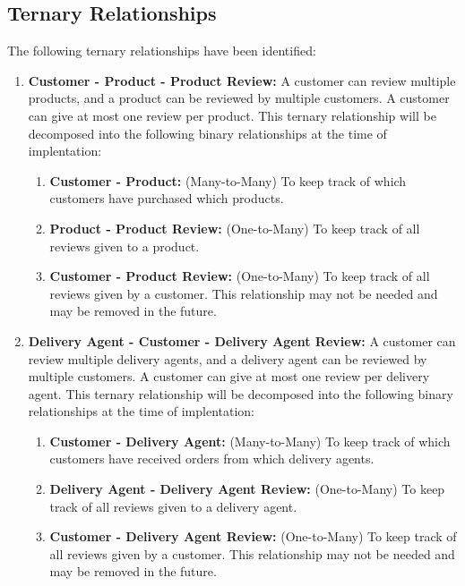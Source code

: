 \subsection*{Ternary Relationships}
The following ternary relationships have been identified:
\begin{enumerate}
    \item \textbf{Customer - Product - Product Review:}
    A customer can review multiple products, and a product can be reviewed by multiple customers.
    A customer can give at most one review per product.
    This ternary relationship will be decomposed into the following binary relationships at the time of implentation:
    \begin{enumerate}
        \item \textbf{Customer - Product:}
        (Many-to-Many) To keep track of which customers have purchased which products.
        \item \textbf{Product - Product Review:}
        (One-to-Many) To keep track of all reviews given to a product.
        \item \textbf{Customer - Product Review:}
        (One-to-Many) To keep track of all reviews given by a customer.
        This relationship may not be needed and may be removed in the future.
    \end{enumerate}
    \item \textbf{Delivery Agent - Customer - Delivery Agent Review:}
    A customer can review multiple delivery agents, and a delivery agent can be reviewed by multiple customers.
    A customer can give at most one review per delivery agent.
    This ternary relationship will be decomposed into the following binary relationships at the time of implentation:
    \begin{enumerate}
        \item \textbf{Customer - Delivery Agent:}
        (Many-to-Many) To keep track of which customers have received orders from which delivery agents.
        \item \textbf{Delivery Agent - Delivery Agent Review:}
        (One-to-Many) To keep track of all reviews given to a delivery agent.
        \item \textbf{Customer - Delivery Agent Review:}
        (One-to-Many) To keep track of all reviews given by a customer.
        This relationship may not be needed and may be removed in the future.
    \end{enumerate}
\end{enumerate}

